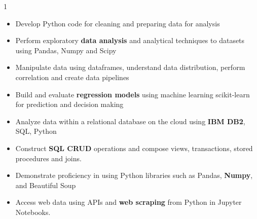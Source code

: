 \documentclass[11pt,a4paper,ragged2e]{altacv}
\begin{document}
\begin{paracol}{1}
\begin{itemize}
\item Develop Python code for cleaning and preparing data for analysis 
\item Perform exploratory \textbf{data analysis} and analytical techniques to datasets using Pandas, Numpy and Scipy
\item Manipulate data using dataframes, understand data distribution, perform correlation and create data pipelines
\item Build and evaluate \textbf{regression models} using machine learning scikit-learn for prediction and decision making
\end{itemize}
\tightdivider

\begin{itemize}
\item Analyze data within a relational database on the cloud using \textbf{IBM DB2}, SQL, Python
\item Construct \textbf{SQL CRUD} operations and compose views, transactions, stored procedures and joins.
\end{itemize}
\tightdivider

\begin{itemize}
\item Demonstrate proficiency in using Python libraries such as Pandas, \textbf{Numpy}, and Beautiful Soup
\item Access web data using APIs and \textbf{web scraping} from Python in Jupyter Notebooks.
\end{itemize}

\medskip



\end{paracol}
\end{document}
